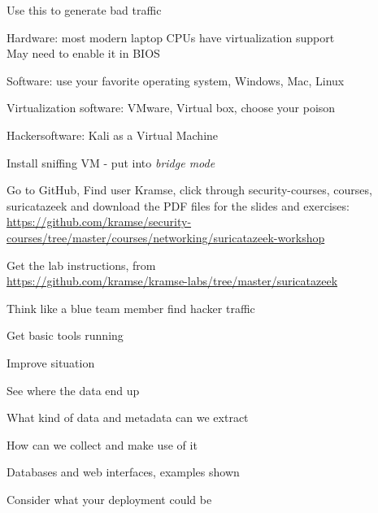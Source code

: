 \documentclass[Screen16to9,17pt]{foils}
\begin{document}
\vskip 1cm
\centerline{Use this to generate bad traffic}



\begin{list2}
\item Hardware: most modern laptop CPUs have virtualization support \\
May need to enable it in BIOS
\item Software: use your favorite operating system, Windows, Mac, Linux
\item Virtualization software: VMware, Virtual box, choose your poison
\item Hackersoftware: Kali as a Virtual Machine 
\item Install sniffing VM - put into \emph{bridge mode}
\end{list2}


\begin{list2}
\item Go to GitHub, Find user Kramse, click through security-courses, courses, suricatazeek and download the PDF files for the slides and exercises:\\  {\footnotesize \url{https://github.com/kramse/security-courses/tree/master/courses/networking/suricatazeek-workshop}}

\item Get the lab instructions, from\\ {\footnotesize\url{https://github.com/kramse/kramse-labs/tree/master/suricatazeek}}
\end{list2}



\begin{list1}
\item Think like a blue team member find hacker traffic
\item Get basic tools running
\item Improve situation
\begin{list2}
\item See where the data end up
\item What kind of data and metadata can we extract
\item How can we collect and make use of it
\item Databases and web interfaces, examples shown
\item Consider what your deployment could be
\end{list2}
\end{list1}
\end{document}

